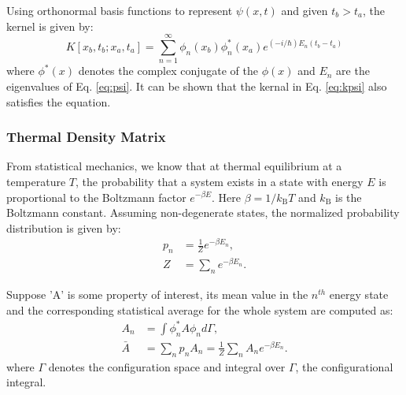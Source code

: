             Using orthonormal basis functions to represent $\psi(x,t)$ and given $t_b > t_a$, the kernel is given by:
            \begin{equation}
                \label{eq:kpsi}
                K[x_b,t_b;x_a,t_a] = \displaystyle\sum\limits_{n = 1}^\infty \phi_n(x_b){\phi^*_n(x_a)} e^{(-i/\hbar)E_n(t_b - t_a)}
            \end{equation}
            where $\phi^*(x)$ denotes the complex conjugate of the $\phi(x)$ and $E_n$ are the eigenvalues of Eq. \eqref{eq:psi}. It can be shown that the kernal in Eq. \eqref{eq:kpsi} also satisfies the \Schrodinger{} equation.

        \subsubsection{Thermal Density Matrix}
            From statistical mechanics, we know that at thermal equilibrium at a temperature $T$, the probability that a system exists in a state with energy $E$ is proportional to the Boltzmann factor $e^{-\beta E}$. Here $\beta = 1/k_\text{B} T$ and $k_\text{B}$ is the Boltzmann constant. Assuming non-degenerate states, the normalized probability distribution is given by:
            \begin{equation}
                \begin{aligned}
                    p_n &= \frac{1}{Z}e^{-\beta E_n}, \\
                    Z &= \displaystyle\sum\limits_n e^{-\beta E_n}.
                \end{aligned}
            \end{equation}
            
            Suppose 'A' is some property of interest, its mean value in the $n^{th}$ energy state and the corresponding statistical average for the whole system are computed as:
            \begin{equation}
                \begin{aligned}
                    A_n &= \displaystyle\int \phi_n^* A \phi_n d\Gamma,\\
                    \bar{A} &= \displaystyle\sum\limits_n p_n A_n = \frac{1}{Z} \displaystyle\sum\limits_n A_n e^{-\beta E_n}.
                \end{aligned}
            \end{equation}
            where $\Gamma$ denotes the configuration space and integral over $\Gamma$, the configurational integral.

